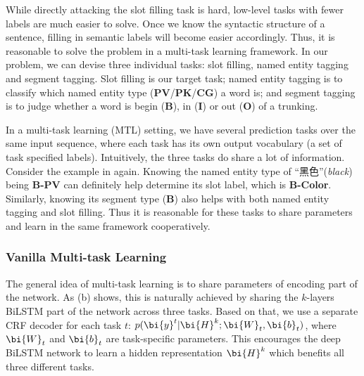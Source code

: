 While directly attacking the slot filling task is hard,
low-level tasks with fewer labels are much easier to solve.
Once we know the syntactic structure of a sentence,
filling in semantic labels will become easier accordingly.
Thus, it is reasonable to solve the problem in a multi-task learning 
framework.
In our problem, we can devise three individual tasks: slot filling, named entity tagging and segment tagging.
Slot filling is our target task;
named entity tagging is to classify which named entity type (\textbf{PV}/\textbf{PK}/\textbf{CG}) a word is;
and segment tagging is to judge 
whether a word is begin (\textbf{B}), in (\textbf{I}) or out (\textbf{O}) of a trunking.

In a multi-task learning (MTL) setting, 
we have several prediction tasks over the same input sequence,
where each task has its own output vocabulary (a set of task 
specified labels).
Intuitively, the three tasks do share a lot of information.
Consider the example in  again. 
Knowing the named entity type of ``黑色''(\emph{black}) being 
\textbf{B-PV}
can definitely help determine its slot label, 
which is \textbf{B-Color}.
Similarly, knowing its segment type (\textbf{B}) 
also helps with both named entity tagging and slot filling.
Thus it is reasonable for these tasks to share parameters
and learn in the same framework cooperatively.

\subsubsection{Vanilla Multi-task Learning}
The general idea of multi-task learning
is to share parameters of encoding part of the network.
As (b) shows,
this is naturally achieved by sharing 
the $k$-layers BiLSTM part of the network across three tasks.
Based on that,
we use a separate CRF decoder for each task $t$:
$p(\bi{y}^t|\bi{H}^k;\bi{W}_t, \bi{b}_t)$,
where $\bi{W}_t$ and $\bi{b}_t$ are task-specific parameters.
This encourages the deep BiLSTM network 
to learn a hidden representation $\bi{H}^k$
which benefits all three different tasks.

